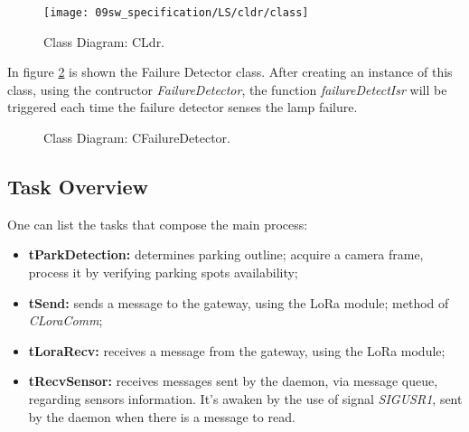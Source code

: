 \begin{figure}[H]
	\centering
	\texttt{[image: 09sw\_specification/LS/cldr/class]}
	\caption{Class Diagram: CLdr.}
	\label{fig:classldr}
\end{figure}

\clearpage
{}

In figure \ref{fig:classfail} is shown the Failure Detector class. After creating an instance of this class, using the contructor \textit{FailureDetector}, the function \textit{failureDetectIsr} will be triggered each time the failure detector senses the lamp failure. 

\begin{figure}[H]
	\centering
	\caption{Class Diagram: CFailureDetector.}
	\label{fig:classfail}
\end{figure}

\clearpage
\subsection{Task Overview}

One can list the tasks that compose the main process:
\begin{itemize}
	\item \textbf{tParkDetection:} determines parking outline; acquire a camera frame, process it by verifying parking spots availability;
 	\item \textbf{tSend:} sends a message to the gateway, using the LoRa module; method of \textit{CLoraComm};
	\item \textbf{tLoraRecv:} receives a message from the gateway, using the LoRa module;
	\item \textbf{tRecvSensor:} receives messages sent by the daemon, via message queue, regarding sensors information. It's awaken by the use of signal \textit{SIGUSR1}, sent by the daemon when there is a message to read.
\end{itemize}

